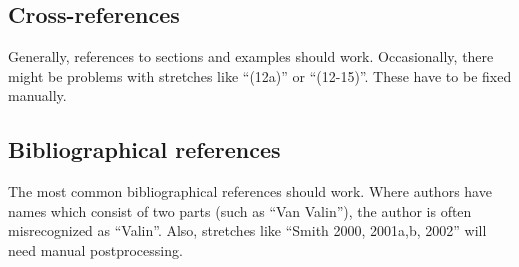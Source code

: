 \subsection{Cross-references}
Generally, references to sections and examples should work. Occasionally, there might be problems with stretches like ``(12a)'' or ``(12-15)''. These have to be fixed manually.

\subsection{Bibliographical references}
The most common bibliographical references should work. Where authors have names which consist of two parts (such as ``Van Valin''), the author is often misrecognized as ``Valin''. Also, stretches like ``Smith 2000, 2001a,b, 2002'' will need manual postprocessing. 




